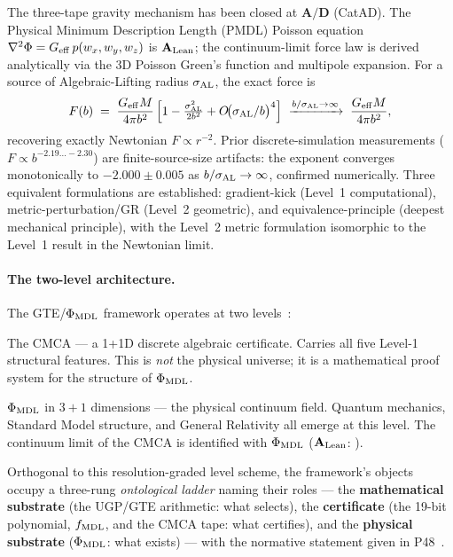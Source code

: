 The three-tape gravity mechanism has been closed at $\mathbf{A/D}$ (CatAD).  The Physical Minimum Description Length (PMDL)
Poisson equation $\nabla^2\Phi = G_{\rm eff}\,p(w_x,w_y,w_z)$ is $\mathbf{A}_{\rm Lean}$;
the continuum-limit force law is derived analytically via the 3D Poisson Green's function
and multipole expansion.  For a source of Algebraic-Lifting radius $\sigma_{\rm AL}$,
the exact force is
\[
  F(b) \;=\; \frac{G_{\rm eff} M}{4\pi b^2}\,
  \Bigl[1 - \tfrac{\sigma_{\rm AL}^2}{2b^2} + O\!\bigl(\sigma_{\rm AL}/b\bigr)^4\Bigr]
  \;\xrightarrow{b/\sigma_{\rm AL}\to\infty}\;
  \frac{G_{\rm eff} M}{4\pi b^2},
\]
recovering exactly Newtonian $F\propto r^{-2}$.  Prior discrete-simulation measurements
($F\propto b^{-2.19\ldots-2.30}$) are finite-source-size artifacts: the exponent
converges monotonically to $-2.000 \pm 0.005$ as $b/\sigma_{\rm AL}\to\infty$, confirmed
numerically.  Three equivalent formulations are established: gradient-kick (Level~1
computational), metric-perturbation/GR (Level~2 geometric), and equivalence-principle
(deepest mechanical principle), with the Level~2 metric formulation isomorphic to the
Level~1 result in the Newtonian limit.

\paragraph{The two-level architecture.}
The GTE/$\Phi_{\rm MDL}$ framework operates at two
levels~\cite{SpivackCompleteness,SpivackCMCA}:
\begin{description}[leftmargin=2.5cm,labelwidth=2.5cm]
\item[\textit{Level~1}:] The CMCA --- a 1+1D discrete algebraic certificate.  Carries
  all five Level-1 structural features.  This is \emph{not} the physical universe; it
  is a mathematical proof system for the structure of $\Phi_{\rm MDL}$.
\item[\textit{Level~2}:] $\Phi_{\rm MDL}$ in $3+1$ dimensions --- the physical
  continuum field.  Quantum mechanics, Standard Model structure, and General
  Relativity all emerge at this level.  The continuum limit of the CMCA is
  identified with $\Phi_{\rm MDL}$ ($\mathbf{A}_{\rm Lean}$:
  ).
\end{description}
Orthogonal to this resolution-graded level scheme, the framework's objects occupy
a three-rung \emph{ontological ladder} naming their roles --- the
\textbf{mathematical substrate} (the UGP/GTE arithmetic: what selects), the
\textbf{certificate} (the 19-bit polynomial, $f_{\rm MDL}$, and the CMCA tape:
what certifies), and the \textbf{physical substrate} ($\Phi_{\rm MDL}$: what
exists) --- with the normative statement given in
P48~\cite{SpivackGTECompleteFramework}.

